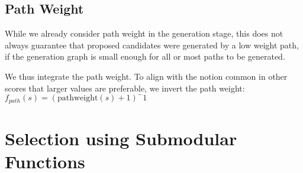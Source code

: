 \documentclass[a4paper,BCOR=10mm]{report}
\begin{document}
\subsection{Path Weight}

While we already consider path weight in the generation stage, this does not always guarantee that proposed candidates were generated by a low weight path, if the generation graph is small enough for all or most paths to be generated.

We thus integrate the path weight. To align with the notion common in other scores that larger values are preferable, we invert the path weight: $f_{path}(s) = (\text{pathweight}(s) + 1)^-1$


\section{Selection using Submodular Functions}


%
%
%
%
%
%
%
%
%
%
\end{document}
